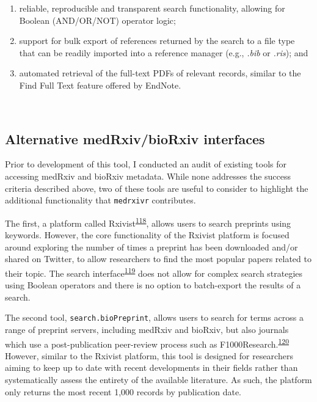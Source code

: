 \documentclass[a4paper, twoside]{templates/ociamthesis}
\begin{document}
\begin{enumerate}
\def\labelenumi{\arabic{enumi}.}
\item
  reliable, reproducible and transparent search functionality, allowing for Boolean (AND/OR/NOT) operator logic;
\item
  support for bulk export of references returned by the search to a file type that can be readily imported into a reference manager (e.g., \emph{.bib} or \emph{.ris}); and
\item
  automated retrieval of the full-text PDFs of relevant records, similar to the Find Full Text feature offered by EndNote.
\end{enumerate}

~

\hypertarget{alternative-medrxivbiorxiv-interfaces}{%
\subsection{Alternative medRxiv/bioRxiv interfaces}\label{alternative-medrxivbiorxiv-interfaces}}

Prior to development of this tool, I conducted an audit of existing tools for accessing medRxiv and bioRxiv metadata. While none addresses the success criteria described above, two of these tools are useful to consider to highlight the additional functionality that \texttt{medrxivr} contributes.

The first, a platform called Rxivist\textsuperscript{\protect\hyperlink{ref-abdill2019}{118}}, allows users to search preprints using keywords. However, the core functionality of the Rxivist platform is focused around exploring the number of times a preprint has been downloaded and/or shared on Twitter, to allow researchers to find the most popular papers related to their topic. The search interface\textsuperscript{\protect\hyperlink{ref-zotero-15027}{119}} does not allow for complex search strategies using Boolean operators and there is no option to batch-export the results of a search.

The second tool, \texttt{search.bioPreprint}, allows users to search for terms across a range of preprint servers, including medRxiv and bioRxiv, but also journals which use a post-publication peer-review process such as F1000Research.\textsuperscript{\protect\hyperlink{ref-iwema2016}{120}} However, similar to the Rxivist platform, this tool is designed for researchers aiming to keep up to date with recent developments in their fields rather than systematically assess the entirety of the available literature. As such, the platform only returns the most recent 1,000 records by publication date.
\end{document}
